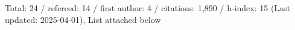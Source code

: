 Total: 24 / refereed: 14 / first author: 4 / citations: 1,890 / h-index: 15 (Last updated: 2025-04-01), List attached below